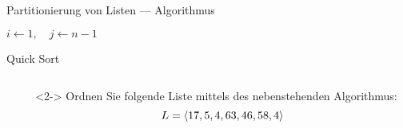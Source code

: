 \begin{frame}{Partitionierung von Listen --- Algorithmus}
\begin{algorithm}[H]
	\caption{Partitionierung}
	\label{sort:alg:partition}
	\DontPrintSemicolon
    $i \gets 1, \quad j \gets n - 1$\;
    \BlankLine
    \;
    \BlankLine
    \;
\end{algorithm}
\end{frame}

\begin{frame}{Quick Sort}
\begin{columns}[T,onlytextwidth]
\begin{column}{0.42\textwidth}
\begin{algorithm}[H]
	\caption{Quick Sort}
	\label{sort:alg:quicksort}
	\DontPrintSemicolon
    \;
\end{algorithm}
\end{column}
\begin{column}{0.53\textwidth}
\begin{task}<2->
Ordnen Sie folgende Liste mittels des nebenstehenden Algorithmus: $$L = \langle17, 5, 4, 63, 46, 58, 4\rangle$$
\end{task}

\end{column}
\end{columns}
\end{frame}

